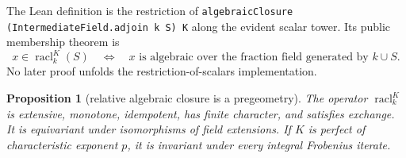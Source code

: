 \documentclass[11pt,oneside]{article}
\newtheorem{proposition}[theorem]{Proposition}
\theoremstyle{definition}
\theoremstyle{remark}
\newcommand{\lean}[1]{\nolinkurl{#1}}
\begin{document}
The Lean definition is the restriction of
{\small\lean{algebraicClosure (IntermediateField.adjoin k S) K}} along the evident scalar
tower.  Its public membership theorem is
\[
 x\in\operatorname{racl}_{k}^{K}(S)
 \quad\Longleftrightarrow\quad
 \text{$x$ is algebraic over the fraction field generated by $k\cup S$}.
\]
No later proof unfolds the restriction-of-scalars implementation.

\begin{proposition}[relative algebraic closure is a pregeometry]
The operator $\operatorname{racl}_{k}^{K}$ is extensive, monotone, idempotent, has
finite character, and satisfies exchange.  It is equivariant under isomorphisms of field
extensions.  If $K$ is perfect of characteristic exponent $p$, it is invariant under
every integral Frobenius iterate.
\end{proposition}
\end{document}
